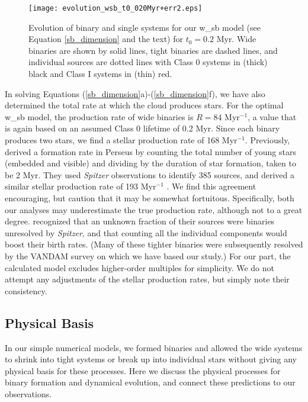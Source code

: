 \documentclass[usenatbib,a4paper]{mnras}
\newcommand{\tOI}{\mbox{$t_{0}$}} %
\begin{document}
\begin{figure}
\texttt{[image: evolution\_wsb\_t0\_020Myr+err2.eps]}
\caption{Evolution of binary and single systems for our w\_sb model (see Equation \ref{sb_dimension} and the text) for $\tOI = 0.2$ Myr.  Wide binaries are shown by solid lines, tight binaries are dashed lines, and individual sources are dotted lines with Class 0 systems in (thick) black and Class I systems in (thin) red.    \label{model_pops}}
\end{figure}


In solving Equations (\ref{sb_dimension}a)-(\ref{sb_dimension}f), we have also determined the total rate at which the cloud produces stars.  For the optimal w\_sb model, the production rate of wide binaries is $R = 84$ Myr$^{-1}$, a value that is again based on an assumed Class 0 lifetime of 0.2 Myr.  Since each binary produces two stars, we find a stellar production rate of 168 Myr$^{-1}$.  Previously, \citet{Evans09} derived a formation rate in Perseus by counting the total number of young stars (embedded and visible) and dividing by the duration of star formation, taken to be 2 Myr.  They used \emph{Spitzer} observations to identify 385 sources, and derived a similar stellar production rate of 193 Myr$^{-1}$ \citep[see also][]{Hatchell07, HsiehLai13, Young15}.  We find this agreement encouraging, but caution that it may be somewhat fortuitous.  Specifically, both our analyses may underestimate the true production rate, although not to a great degree.  \citet{Evans09} recognized that an unknown fraction of their sources were binaries unresolved by \emph{Spitzer}, and that counting all the individual components would boost their birth rates.  (Many of these tighter binaries were subsequently resolved by the VANDAM survey on which we have based our study.)  For our part, the calculated model excludes higher-order multiples for simplicity.  We do not attempt any adjustments of the stellar production rates, but simply note their consistency.


\subsection{Physical Basis}\label{basis}

In our simple numerical models, we formed binaries and allowed the wide systems to shrink into tight systems or break up into individual stars without giving any physical basis for these processes.  Here we discuss the physical processes for binary formation and dynamical evolution, and connect these predictions to our observations.
\end{document}

